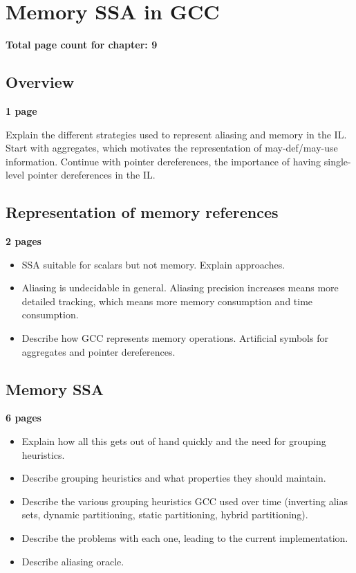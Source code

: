 \applynumberofpages\chapter{Memory SSA in GCC }

\textbf{Total page count for chapter: 9}

\section{Overview}

\textbf{1 page}

Explain the different strategies used to represent aliasing and
memory in the IL.  Start with aggregates, which motivates the
representation of may-def/may-use information.  Continue with
pointer dereferences, the importance of having single-level
pointer dereferences in the IL.

\section{Representation of memory references}

\textbf{2 pages}

\begin{itemize}
\item	SSA suitable for scalars but not memory.  Explain
	approaches.

\item	Aliasing is undecidable in general.  Aliasing precision
	increases means more detailed tracking, which means more
	memory consumption and time consumption.

\item	Describe how GCC represents memory operations.
	Artificial symbols for aggregates and pointer
	dereferences.
\end{itemize}

\section{Memory SSA}

\textbf{6 pages}

\begin{itemize}
\item	Explain how all this gets out of hand quickly and the
	need for grouping heuristics.

\item	Describe grouping heuristics and what properties they
	should maintain.

\item	Describe the various grouping heuristics GCC used over
	time (inverting alias sets, dynamic partitioning, static
	partitioning, hybrid partitioning).

\item	Describe the problems with each one, leading to the
	current implementation.

\item	Describe aliasing oracle.
\end{itemize}


